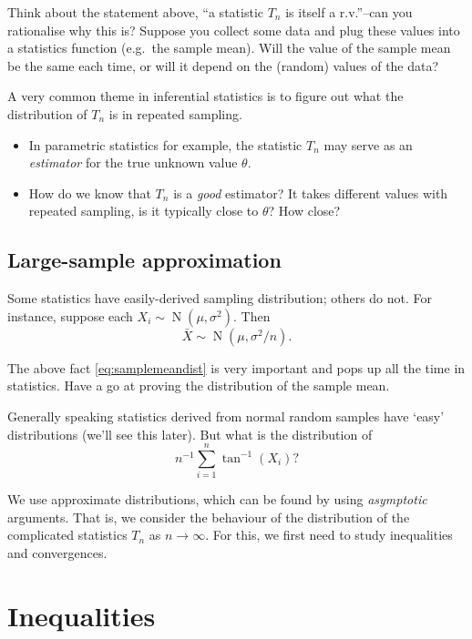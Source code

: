\documentclass[
]{book}
\providecommand{\tightlist}{%
  \setlength{\itemsep}{0pt}\setlength{\parskip}{0pt}}
\DeclareMathOperator{\N}{N}
\theoremstyle{definition}
\theoremstyle{definition}
\theoremstyle{definition}
\theoremstyle{definition}
\theoremstyle{remark}
\begin{document}
Think about the statement above, ``a statistic \(T_n\) is itself a r.v.''--can you rationalise why this is? Suppose you collect some data and plug these values into a statistics function (e.g.~the sample mean). Will the value of the sample mean be the same each time, or will it depend on the (random) values of the data?

A very common theme in inferential statistics is to figure out what the distribution of \(T_n\) is in repeated sampling.

\begin{itemize}
\tightlist
\item
  In parametric statistics for example, the statistic \(T_n\) may serve as an \emph{estimator} for the true unknown value \(\theta\).
\item
  How do we know that \(T_n\) is a \emph{good} estimator? It takes different values with repeated sampling, is it typically close to \(\theta\)? How close?
\end{itemize}

\hypertarget{large-sample-approximation}{%
\subsection{Large-sample approximation}\label{large-sample-approximation}}

Some statistics have easily-derived sampling distribution; others do not.
For instance, suppose each \(X_i\sim\N(\mu,\sigma^2)\). Then
\begin{equation}
\bar X \sim \N(\mu, \sigma^2/n). \label{eq:samplemeandist}
\end{equation}

The above fact \eqref{eq:samplemeandist} is very important and pops up all the time in statistics. Have a go at proving the distribution of the sample mean.

Generally speaking statistics derived from normal random samples have `easy' distributions (we'll see this later).
But what is the distribution of
\[
n^{-1}\sum_{i=1}^n \tan^{-1}(X_i)?
\]

We use approximate distributions, which can be found by using \emph{asymptotic} arguments.
That is, we consider the behaviour of the distribution of the complicated statistics \(T_n\) as \(n\to\infty\).
For this, we first need to study inequalities and convergences.

\hypertarget{inequalities}{%
\section{Inequalities}\label{inequalities}}
\end{document}
